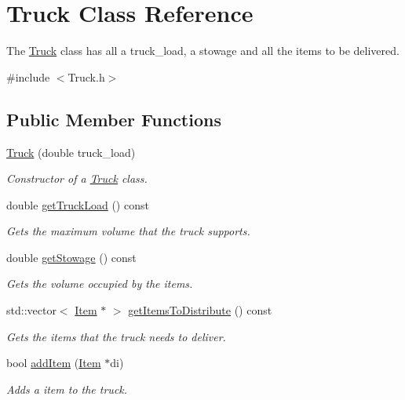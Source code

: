 \hypertarget{class_truck}{}\section{Truck Class Reference}
\label{class_truck}


The \hyperlink{class_truck}{Truck} class has all a truck\+\_\+load, a stowage and all the items to be delivered.  




{\ttfamily \#include $<$Truck.\+h$>$}

\subsection*{Public Member Functions}
\begin{DoxyCompactItemize}
\item 
\hyperlink{class_truck_a38fedf8b733279a975f945aa998b8542}{Truck} (double truck\+\_\+load)
\begin{DoxyCompactList}\small\item\em Constructor of a \hyperlink{class_truck}{Truck} class. \end{DoxyCompactList}\item 
double \hyperlink{class_truck_aef937769001a3468fc41ebb9df7e4871}{get\+Truck\+Load} () const 
\begin{DoxyCompactList}\small\item\em Gets the maximum volume that the truck supports. \end{DoxyCompactList}\item 
double \hyperlink{class_truck_a8e5df7632c01c338356682a6ea6536c0}{get\+Stowage} () const 
\begin{DoxyCompactList}\small\item\em Gets the volume occupied by the items. \end{DoxyCompactList}\item 
std\+::vector$<$ \hyperlink{class_item}{Item} $\ast$ $>$ \hyperlink{class_truck_ac8a4138c1c38d0eebfba9c9a58df7341}{get\+Items\+To\+Distribute} () const 
\begin{DoxyCompactList}\small\item\em Gets the items that the truck needs to deliver. \end{DoxyCompactList}\item 
bool \hyperlink{class_truck_a894390c8eab2a56f7c90ffd7016fa17d}{add\+Item} (\hyperlink{class_item}{Item} $\ast$di)
\begin{DoxyCompactList}\small\item\em Adds a item to the truck. \end{DoxyCompactList}\item 

\end{DoxyCompactItemize}
